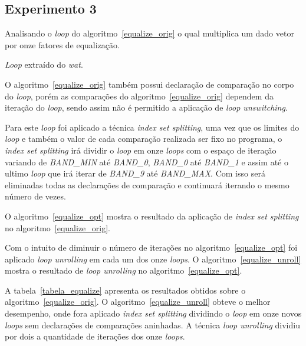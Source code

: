 \newpage
\subsection{Experimento 3}

Analisando o \textit{loop} do algoritmo~\ref{equalize_orig} o qual multiplica um dado 
vetor por onze fatores de equalização.

\begin{algorithm}[H]
  \caption{\textit{Loop} extraído do \textit{wat}.}
\label{equalize_orig}

\end{algorithm}

O algoritmo~\ref{equalize_orig} também possui declaração de comparação no corpo do
\textit{loop}, porém as comparações do algoritmo~\ref{equalize_orig} dependem da
iteração do \textit{loop}, sendo assim não é permitido a aplicação de
\textit{loop unswitching}.

Para este \textit{loop} foi aplicado a técnica \textit{index set
splitting}, uma vez que os limites do \textit{loop} e também o valor de cada
comparação realizada ser fixo no programa, o \textit{index set splitting} irá
dividir o \textit{loop} em onze \textit{loops} com o espaço de iteração variando
de \textit{BAND\_MIN} até \textit{BAND\_0}, \textit{BAND\_0} até \textit{BAND\_1} e
assim até o ultimo \textit{loop} que irá iterar de \textit{BAND\_9} até
\textit{BAND\_MAX}. Com isso será eliminadas todas as declarações de comparação e
continuará iterando o mesmo número de vezes.

O algoritmo~\ref{equalize_opt} mostra o resultado da aplicação de 
\textit{index set splitting} no algoritmo~\ref{equalize_orig}.

Com o intuito de diminuir o número de iterações no algoritmo~\ref{equalize_opt}
foi aplicado \textit{loop unrolling} em cada um dos onze \textit{loops}. 
O algoritmo~\ref{equalize_unroll} mostra o resultado de \textit{loop unrolling}
no algoritmo~\ref{equalize_opt}.

A tabela~\ref{tabela_equalize} apresenta os resultados obtidos sobre o
algoritmo~\ref{equalize_orig}. O algoritmo~\ref{equalize_unroll} obteve o melhor
desempenho, onde fora aplicado \textit{index set splitting} dividindo o
\textit{loop} em onze novos \textit{loops} sem declarações de comparações
aninhadas. A técnica \textit{loop unrolling} dividiu por dois a quantidade de
iterações dos onze \textit{loops}.


